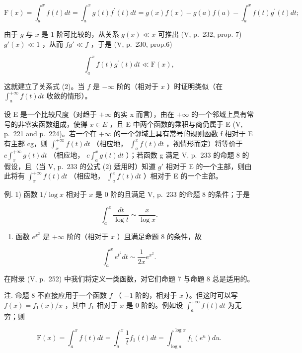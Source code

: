 \[
\mathrm{F} (x) = \int_ {a} ^ {x} f (t) d t = \int_ {a} ^ {x} g (t) f ^ {\prime} (t) d t = g (x) f (x) - g (a) f (a) - \int_ {a} ^ {x} f (t) g ^ {\prime} (t) d t;
\]

由于 \(g\) 与 \(x\) 是 1 阶可比较的，从关系 \(g(x) \ll x\) 可推出 (V, p.~232, prop. 7) \(g'(x) \ll 1\) ，从而 \(fg' \ll f\) ，于是 (V, p.~230, prop.6)

\[
\int_ {a} ^ {x} f (t) g ^ {\prime} (t) d t \ll \mathrm{F} (x),
\]

这就建立了关系式 (2)。当 \(f\) 是 \(-\infty\) 阶的（相对于 \(x\) ）时证明类似（在 \(\int_{a}^{+\infty} f(t) dt\) 收敛的情形）。

设 E 是一个比较尺度（对趋于 \(+\infty\) 的实 x 而言），由在 \(+\infty\) 的一个邻域上具有常号的非零实函数组成，使得 \(x \in E\) ，且 E 中两个函数的乘积与商仍属于 E (V, p.~221 and p.~224)。若一个在 \(+\infty\) 的一个邻域上具有常号的规则函数 f 相对于 E 有主部 cg，则 \(\int_{x}^{+\infty} f(t) dt\) （相应地， \(\int_{a}^{x} f(t) dt\) ，视情形而定）将等价于 \(c \int_{x}^{+\infty} g(t) dt\) （相应地， \(c \int_{a}^{x} g(t) dt\) ）；若函数 g 满足 V, p.~233 的命题 8 的假设，且（当 V, p.~233 的公式 (2) 适用时）知道 \(g'\) 相对于 E 的一个主部，则由此将有 \(\int_{x}^{+\infty} f(t) dt\) （相应地， \(\int_{a}^{x} f(t) dt\) ）相对于 E 的一个主部。

例. 1) 函数 \(1 / \log x\) 相对于 \(x\) 是 0 阶的且满足 V, p.~233 的命题 8 的条件；于是

\[
\int_ {a} ^ {x} \frac {d t}{\log t} \sim \frac {x}{\log x}.
\]

\begin{enumerate}
\def\labelenumi{\arabic{enumi})}
\setcounter{enumi}{1}
\tightlist
\item
  函数 \(e^{x^2}\) 是 \(+\infty\) 阶的（相对于 \(x\) ）且满足命题 8 的条件，故
\end{enumerate}

\[
\int_ {a} ^ {x} e ^ {t ^ {2}} d t \sim \frac {1}{2 x} e ^ {x ^ {2}}.
\]

在附录 (V, p.~252) 中我们将定义一类函数，对它们命题 7 与命题 8 总是适用的。

注. 命题 8 不直接应用于一个函数 \(f\) （ \(-1\) 阶的，相对于 \(x\) ）。但这时可以写 \(f(x) = f_1(x) / x\) ，其中 \(f_1\) 相对于 \(x\) 是 0 阶的。例如设 \(\int_{a}^{+\infty} f(t) dt\) 为无穷；则

\[
\mathrm{F} (x) = \int_ {a} ^ {x} f (t) d t = \int_ {a} ^ {x} \frac {1}{t} f _ {1} (t) d t = \int_ {\log a} ^ {\log x} f _ {1} \left(e ^ {u}\right) d u.
\]

